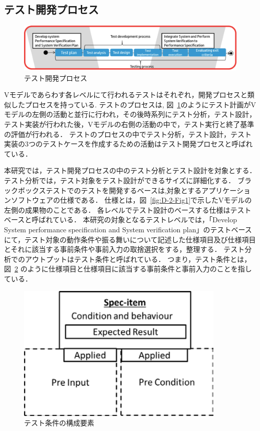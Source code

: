 \subsection{テスト開発プロセス}
\begin{figure}[htbp]
  \begin{center}
  \includegraphics[width=14cm]{./image/D-2-Fig2.png}
  \caption{テスト開発プロセス}
  \label{fig:D-2-Fig2}
  \end{center}
\end{figure}
Vモデルであらわす各レベルにて行われるテストはそれぞれ，開発プロセスと類似したプロセスを持っている\cite{ISTQB}.
テストのプロセスは, 図~\ref{fig:D-2-Fig2}のようにテスト計画がVモデルの左側の活動と並行に行われ，その後時系列にテスト分析，テスト設計，テスト実装が行われた後，Vモデルの右側の活動の中で，テスト実行と終了基準の評価が行われる．
テストのプロセスの中でテスト分析，テスト設計，テスト実装の3つのテストケースを作成するための活動はテスト開発プロセスと呼ばれている\cite{ISTQB}．

本研究では，テスト開発プロセスの中のテスト分析とテスト設計を対象とする．
テスト分析では，テスト対象をテスト設計ができるサイズに詳細化する．
ブラックボックステストでのテストを開発するベースは,対象とするアプリケーションソフトウェアの仕様である．
仕様とは，図~\ref{fig:D-2-Fig1}で示したVモデルの左側の成果物のことである．
各レベルでテスト設計のベースする仕様はテストベースと呼ばれている．
本研究の対象となるテストレベルでは，「Develop System performance specification and System verification plan」のテストベースにて，テスト対象の動作条件や振る舞いについて記述した仕様項目及び仕様項目とそれに該当する事前条件や事前入力の取捨選択をする，整理する．
テスト分析でのアウトプットはテスト条件と呼ばれている．
つまり，テスト条件とは，図~\ref{fig:D-4-Fig1} のように仕様項目と仕様項目に該当する事前条件と事前入力のことを指している．
\begin{figure}[h]
  \begin{center}
  \includegraphics[width=10cm]{./image/D-4-Fig1.png}
  \caption{テスト条件の構成要素}
  \label{fig:D-4-Fig1}
  \end{center}
   \end{figure}

